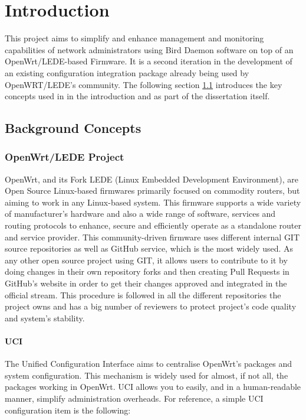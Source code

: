 \chapter{Introduction}
\label{ch:introduction}
\pagestyle{headings}

This project aims to simplify and enhance management and monitoring capabilities of network administrators using Bird Daemon software on top of an OpenWrt/LEDE-based Firmware. It is a second iteration in the development of an existing configuration integration package already being used by OpenWRT/LEDE's community. The following section \ref{ch:backc} introduces the key concepts used in in the introduction and as part of the dissertation itself.

\section{Background Concepts}
\label{ch:backc}

\subsection{OpenWrt/LEDE Project}
\label{subsec:owrtlp}
OpenWrt, and its Fork LEDE (Linux Embedded Development Environment), are Open Source Linux-based firmwares primarily focused on commodity routers, but aiming to work in any Linux-based system. This firmware supports a wide variety of manufacturer's hardware and also a wide range of software, services and routing protocols to enhance, secure and efficiently operate as a standalone router and service provider. This community-driven firmware uses different internal GIT source repositories as well as GitHub service, which is the most widely used. As any other open source project using GIT, it allows users to contribute to it by doing changes in their own repository forks and then creating Pull Requests in GitHub's website in order to get their changes approved and integrated in the official stream. This procedure is followed in all the different repositories the project owns and has a big number of reviewers to protect project's code quality and system's stability.

\subsubsection{UCI}
The Unified Configuration Interface aims to centralise OpenWrt's packages and system configuration. This mechanism is widely used for almost, if not all, the packages working in OpenWrt. UCI allows you to easily, and in a human-readable manner, simplify administration overheads. For reference, a simple UCI configuration item is the following: 

